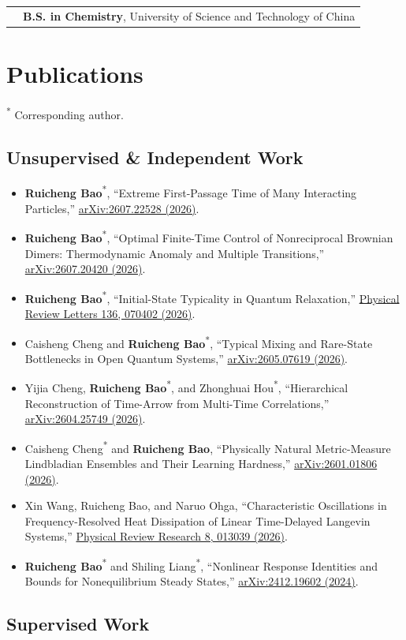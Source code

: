 \documentclass[10pt,a4paper]{article}
\makeatletter
\newcommand{\entry}[2]{%
  \begin{tabularx}{\textwidth}{@{}p{0.19\textwidth}X@{}}
    \color{muted}#1 & #2
  \end{tabularx}\par
}
\newcommand{\pub}[4]{%
  \item #1, ``#2,'' \href{#4}{#3}.
}
\newcommand{\corr}[1]{#1\textsuperscript{*}}
\makeatother
\begin{document}
\entry{}{\textbf{B.S. in Chemistry}, University of Science and Technology of China}

\section{Publications}

{\footnotesize\color{muted}\textsuperscript{*} Corresponding author.}

\subsection{Unsupervised \& Independent Work}

\begin{itemize}
  \pub{\corr{\textbf{Ruicheng Bao}}}{Extreme First-Passage Time of Many Interacting Particles}{arXiv:2607.22528 (2026)}{https://arxiv.org/abs/2607.22528}
  \pub{\corr{\textbf{Ruicheng Bao}}}{Optimal Finite-Time Control of Nonreciprocal Brownian Dimers: Thermodynamic Anomaly and Multiple Transitions}{arXiv:2607.20420 (2026)}{https://arxiv.org/abs/2607.20420}
  \pub{\corr{\textbf{Ruicheng Bao}}}{Initial-State Typicality in Quantum Relaxation}{Physical Review Letters 136, 070402 (2026)}{https://doi.org/10.1103/wgr5-lb6b}
  \pub{Caisheng Cheng and \corr{\textbf{Ruicheng Bao}}}{Typical Mixing and Rare-State Bottlenecks in Open Quantum Systems}{arXiv:2605.07619 (2026)}{https://arxiv.org/abs/2605.07619}
  \pub{Yijia Cheng, \corr{\textbf{Ruicheng Bao}}, and \corr{Zhonghuai Hou}}{Hierarchical Reconstruction of Time-Arrow from Multi-Time Correlations}{arXiv:2604.25749 (2026)}{https://arxiv.org/abs/2604.25749}
  \pub{\corr{Caisheng Cheng} and \textbf{Ruicheng Bao}}{Physically Natural Metric-Measure Lindbladian Ensembles and Their Learning Hardness}{arXiv:2601.01806 (2026)}{https://arxiv.org/abs/2601.01806}
  \pub{Xin Wang, Ruicheng Bao, and Naruo Ohga}{Characteristic Oscillations in Frequency-Resolved Heat Dissipation of Linear Time-Delayed Langevin Systems}{Physical Review Research 8, 013039 (2026)}{https://doi.org/10.1103/x2dm-9p8m}
  \pub{\corr{\textbf{Ruicheng Bao}} and \corr{Shiling Liang}}{Nonlinear Response Identities and Bounds for Nonequilibrium Steady States}{arXiv:2412.19602 (2024)}{https://arxiv.org/abs/2412.19602}
\end{itemize}

\newpage
\subsection{Supervised Work}
\end{document}
